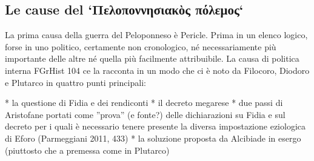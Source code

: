 {            \subsection*{Le cause del `Πελοποννησιακὸς πόλεμος`}
            
            La prima causa della guerra del Peloponneso è Pericle. Prima in un elenco logico, forse in uno politico, certamente non cronologico, né necessariamente più importante delle altre né quella più facilmente attribuibile. La causa di politica interna FGrHist 104 ce la racconta in un modo che ci è noto da Filocoro,  Diodoro e Plutarco in quattro punti principali: 
            
            *  la questione di Fidia e dei rendiconti
            *  il decreto megarese 
            *  due passi di Aristofane  portati come ''prova'' (e fonte?) delle dichiarazioni su Fidia e sul decreto per i quali è necessario tenere presente la diversa impostazione eziologica di Eforo (Parmeggiani 2011, 433)
            	*  la soluzione proposta da Alcibiade in esergo (piuttosto che a premessa come in Plutarco)
	 
}
